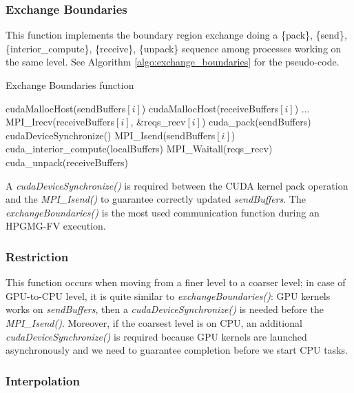 \documentclass[conference]{IEEEtran}
\begin{document}
\subsubsection{Exchange Boundaries}

This function implements the boundary region exchange doing a \{pack\}, \{send\}, \{interior\_compute\}, \{receive\}, \{unpack\} sequence among processes working on the same level. See Algorithm \ref{algo:exchange_boundaries} for the pseudo-code.

\begin{algorithm}
\small
\caption{Exchange Boundaries function}
\label{algo:exchange_boundaries}
\begin{algorithmic}[1]
\State cudaMallocHost(sendBuffers$[i]$)
\State cudaMallocHost(receiveBuffers$[i]$)
\EndFor
\State ...
 \label{alg:b}
		\State MPI\_Irecv(receiveBuffers$[i]$, \&reqs\_recv$[i]$)    
	\EndFor
	\State cuda\_pack(sendBuffers)
	\State cudaDeviceSynchronize()
		\State MPI\_Isend(sendBuffers$[i]$)    
	\EndFor
	\State cuda\_interior\_compute(localBuffers)
	\State MPI\_Waitall(reqs\_recv)
	\State cuda\_unpack(receiveBuffers)
\EndFunction
\end{algorithmic}
\end{algorithm}

A \textit{cudaDeviceSynchronize()} is required between the CUDA kernel pack operation and the \textit{MPI\_Isend()} to guarantee correctly updated \textit{sendBuffers}.
The \textit{exchangeBoundaries()} is the most used communication function during an HPGMG-FV execution.

\subsubsection{Restriction}

This function occurs when moving from a finer level to a coarser level; in case of GPU-to-CPU level, it is quite similar to \textit{exchangeBoundaries()}: GPU kernels works on \textit{sendBuffers}, then a \textit{cudaDeviceSynchronize()} is needed before the \textit{MPI\_Isend()}. Moreover, if the coarsest level is on CPU, an additional \textit{cudaDeviceSynchronize()} is required because GPU kernels are launched asynchronously and we need to guarantee completion before we start CPU tasks.

\subsubsection{Interpolation}
\end{document}
